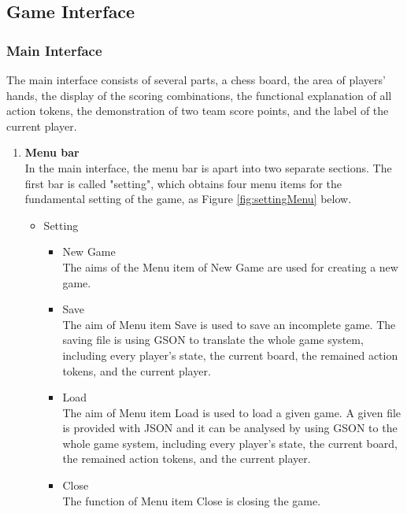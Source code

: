 \subsection{Game Interface}

\subsubsection{Main Interface}

The main interface consists of several parts, a chess board, the area of players' hands, the display of the scoring combinations, the functional explanation of all action tokens, the demonstration of two team score points, and the label of the current player. 

\begin{enumerate}
	
	\item\textbf{Menu bar}\\
    In the main interface, the menu bar is apart into two separate sections. The first bar is called "setting", which obtains four menu items for the fundamental setting of the game, as Figure \ref{fig:settingMenu} below. 
	\begin{itemize}
		\item{Setting} \\ 
		\begin{itemize}
			\item {New Game} \\ 
		    The aims of the Menu item of New Game are used for creating a new game. 
			
			\item {Save} \\
			The aim of Menu item Save is used to save an incomplete game. The saving file is using GSON to translate the whole game system, including every player's state, the current board, the remained action tokens, and the current player.  
			
			\item {Load} \\
			The aim of Menu item Load is used to load a given game. A given file is provided with JSON and it can be analysed by using GSON to the whole game system, including every player's state, the current board, the remained action tokens, and the current player.  
			
			\item {Close} \\ 
			The function of Menu item Close is closing the game. 
			

\end{itemize}
\end{itemize}
\end{enumerate}

